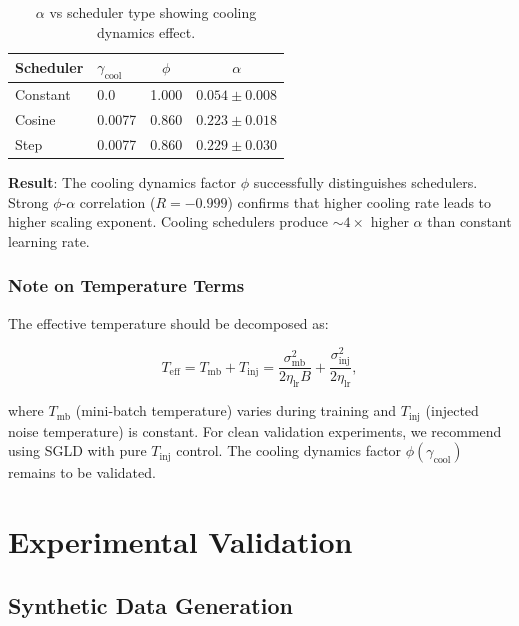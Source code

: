 \documentclass[11pt, a4paper]{article}
\theoremstyle{definition}
\begin{document}
\begin{table}[htbp]
\centering
\caption{$\alpha$ vs scheduler type showing cooling dynamics effect.}
\label{tab:cool_scaling}
\begin{tabular}{@{}llcc@{}}
\toprule
\textbf{Scheduler} & $\gamma_{\text{cool}}$ & $\phi$ & $\alpha$ \\
\midrule
Constant & 0.0 & 1.000 & $0.054 \pm 0.008$ \\
Cosine & 0.0077 & 0.860 & $0.223 \pm 0.018$ \\
Step & 0.0077 & 0.860 & $0.229 \pm 0.030$ \\
\bottomrule
\end{tabular}
\end{table}

\textbf{Result}: The cooling dynamics factor $\phi$ successfully distinguishes schedulers. Strong $\phi$-$\alpha$ correlation ($R = -0.999$) confirms that higher cooling rate leads to higher scaling exponent. Cooling schedulers produce $\sim 4\times$ higher $\alpha$ than constant learning rate.

\subsubsection{Note on Temperature Terms}

The effective temperature should be decomposed as:

\begin{equation}
T_{\text{eff}} = T_{\text{mb}} + T_{\text{inj}} = \frac{\sigma_{\text{mb}}^2}{2\eta_{\text{lr}}B} + \frac{\sigma_{\text{inj}}^2}{2\eta_{\text{lr}}},
\end{equation}

where $T_{\text{mb}}$ (mini-batch temperature) varies during training and $T_{\text{inj}}$ (injected noise temperature) is constant. For clean validation experiments, we recommend using SGLD with pure $T_{\text{inj}}$ control. The cooling dynamics factor $\phi(\gamma_{\text{cool}})$ remains to be validated.

\section{Experimental Validation}
\label{sec:experiments}

\subsection{Synthetic Data Generation}
\label{sec:synthetic_data}
\end{document}
